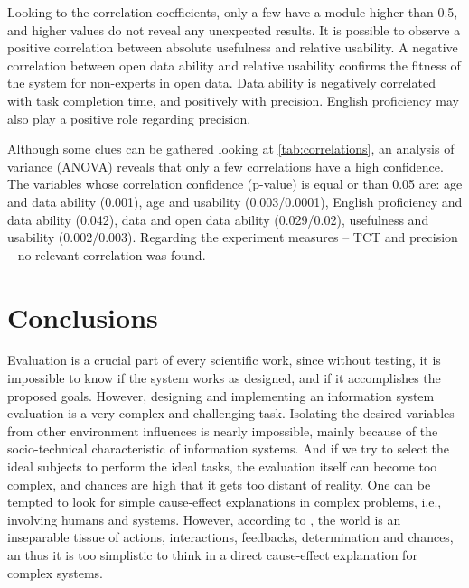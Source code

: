 Looking to the correlation coefficients, only a few have a module higher than 0.5, and higher values do not reveal any unexpected results.
It is possible to observe a positive correlation between absolute usefulness and relative usability.
A negative correlation between open data ability and relative usability confirms the fitness of the system for non-experts in open data.
Data ability is negatively correlated with task completion time, and positively with precision.
English proficiency may also play a positive role regarding precision.

Although some clues can be gathered looking at \autoref{tab:correlations}, an analysis of variance (ANOVA) reveals that only a few correlations have a high confidence.
The variables whose correlation confidence (p-value) is equal or than 0.05 are: age and data ability (0.001), age and usability (0.003/0.0001), English proficiency and data ability (0.042), data and open data ability (0.029/0.02), usefulness and usability (0.002/0.003).
Regarding the experiment measures -- TCT and precision -- no relevant correlation was found.

\section{Conclusions}
\label{sec:conclusion}


Evaluation is a crucial part of every scientific work, since without testing, it is impossible to know if the system works as designed, and if it accomplishes the proposed goals.
However, designing and implementing an information system evaluation is a very complex and challenging task.
Isolating the desired variables from other environment influences is nearly impossible, mainly because of the socio-technical characteristic of information systems.
And if we try to select the ideal subjects to perform the ideal tasks, the evaluation itself can become too complex, and chances are high that it gets too distant of reality.
One can be tempted to look for simple cause-effect explanations in complex problems, i.e., involving humans and systems.
However, according to , the world is an inseparable tissue of actions, interactions, feedbacks, determination and chances, an thus it is too simplistic to think in a direct cause-effect explanation for complex systems.

